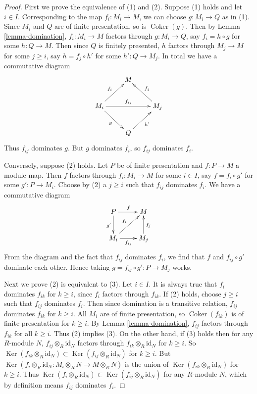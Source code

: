\documentclass[10pt,a4paper]{amsart}
\theoremstyle{plain}
\theoremstyle{definition}
\theoremstyle{remark}
\numberwithin{equation}{subsection}
\def\Ker{\mathop{\mathrm{Ker}}}
\def\Coker{\mathop{\mathrm{Coker}}}
\begin{document}
\begin{proof}
First we prove the equivalence of (1) and (2).  Suppose (1) holds and let $i
\in I$. Corresponding to the map $f_i: M_i \to M$, we can choose $g:
M_i \to Q$ as in (1).  Since $M_i$ and $Q$ are of finite presentation,
so is $\Coker(g)$.  Then by Lemma \ref{lemma-domination}, $f_i : M_i
\to M$ factors through $g: M_i \to Q$, say $f_i = h \circ g$
for some $h: Q \to M$.  Then since $Q$ is finitely presented, $h$
factors through $M_j \to M$ for some $j \geq i$, say $h = f_j \circ h'$
for some $h': Q \to M_j$.  In total we have a commutative diagram
$$
\xymatrix{
  &  M  & \\
M_i \ar[dr]_g \ar[ur]^{f_i} \ar[rr]^{f_{ij}} &
& M_j \ar[ul]_{f_j} \\
  & Q  \ar[ur]_{h'} &
}
$$
Thus $f_{ij}$ dominates $g$.  But $g$ dominates $f_i$, so $f_{ij}$ dominates
$f_i$.

\medskip\noindent
Conversely, suppose (2) holds.  Let $P$ be of finite presentation and $f: P
\to M$ a module map.  Then $f$ factors through $f_i: M_i \to M$
for some $i \in I$, say $f = f_i \circ g'$ for some $g': P \to M_i$.
Choose by (2) a $j \geq i$ such that $f_{ij}$ dominates $f_i$.  We have a
commutative diagram
$$
\xymatrix{
P \ar[d]_{g'} \ar[r]^{f}           & M  \\
M_i \ar[ur]^{f_i} \ar[r]_{f_{ij}} & M_j \ar[u]_{f_j}
}
$$
From the diagram and the fact that $f_{ij}$ dominates $f_i$, we find that $f$
and $f_{ij} \circ g'$ dominate each other.  Hence taking $g = f_{ij} \circ g' :
P \to M_j$ works.

\medskip\noindent
Next we prove (2) is equivalent to (3).  Let $i \in I$.  It is always true that
$f_i$ dominates $f_{ik}$ for $k \geq i$, since $f_i$ factors through
$f_{ik}$.  If (2) holds, choose $j \geq i$ such that $f_{ij}$ dominates
$f_i$.  Then since domination is a transitive relation, $f_{ij}$ dominates
$f_{ik}$ for $k \geq i$. All $M_i$ are of finite presentation, so
$\Coker(f_{ik})$ is of finite presentation for $k \geq i$.  By Lemma
\ref{lemma-domination}, $f_{ij}$ factors through $f_{ik}$ for all $k \geq i$.
Thus (2) implies (3).  On the other hand, if (3) holds then for any $R$-module
$N$, $f_{ij} \otimes_R \text{id}_N$ factors through $f_{ik}
\otimes_R \text{id}_N$ for $k \geq i$.  So $\Ker(f_{ik} \otimes_R
\text{id}_N) \subset \Ker(f_{ij} \otimes_R \text{id}_N)$ for $k
\geq i$.  But $\Ker(f_i \otimes_R \text{id}_N: M_i \otimes_R N
\to M \otimes_R N)$ is the union of $\Ker(f_{ik} \otimes_R
\text{id}_N)$ for $k \geq i$.  Thus $\Ker(f_i \otimes_R
\text{id}_N) \subset \Ker(f_{ij} \otimes_R \text{id}_N)$ for
any $R$-module $N$, which by definition means $f_{ij}$ dominates $f_i$.


\end{proof}
\end{document}
